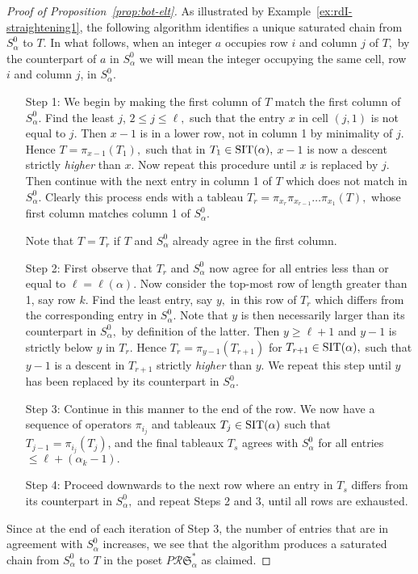 \documentclass[12pt,letterpaper]{amsart}
\theoremstyle{definition}
\newcommand{\rdI}{\mathcal{R}\mathfrak{S}^*}
\begin{document}
\begin{proof}[Proof of Proposition~\ref{prop:bot-elt}]  As illustrated by Example~\ref{ex:rdI-straightening1}, the following algorithm identifies a unique saturated  chain from $S^0_\alpha$ to $T.$  In what follows, when an integer  $a$ occupies row $i$ and column $j$ of $T,$ by the counterpart of $a$ in $S^0_\alpha$ we will mean the integer occupying the same cell, row $i$ and column $j$, in $S^0_\alpha.$ 
\begin{enumerate}
    \item[Step 1:] We begin by making the first column of $T$ match the first column of $S^0_\alpha.$  Find the least $j$, $2\le j\le \ell,$ such that the entry $x$ in cell $(j,1)$ is not equal to $j.$ Then $x-1$ is in a lower row, not in column 1 by minimality of $j$. Hence $T=\pi_{x-1}(T_1),$ such that in $T_1\in\operatorname{SIT}(\alpha),$  $x-1$ is now a descent strictly \textit{higher} than $x.$  Now repeat this procedure until $x$ is replaced by $j.$ Then continue with the next entry in column 1 of $T$ which does not match 
    in $S^0_\alpha.$  Clearly this process ends with a tableau $T_r=\pi_{x_r}\pi_{x_{r-1}}\ldots \pi_{x_1}(T),$ whose first column matches  column 1 of $S^0_\alpha.$
    
    Note that $T=T_r$ if $T$ and $S^0_\alpha$ already agree in the first column.
    \item[Step 2:] First observe that $T_r$ and $S^0_\alpha$ now agree for all entries less than or equal to $\ell=\ell(\alpha).$ Now consider the top-most row of length greater than 1, say row $k$.  Find the least entry, say $y,$ in this row of $T_r$ which differs from the corresponding entry in $S^0_\alpha.$ Note that $y$ is then necessarily larger than its counterpart in $S^0_\alpha,$ by definition of the latter. Then $y\ge \ell+1$ and $y-1$ is strictly below $y$ in $T_r.$  Hence 
    $T_r=\pi_{y-1}(T_{r+1})$ for $T_{r+1}\in \operatorname{SIT}(\alpha),$ such that $y-1$ is a descent in $T_{r+1}$  strictly \textit{higher} than $y$.  We repeat this step until $y$ has been replaced by its counterpart in $S^0_\alpha.$  
    
    \item[Step 3:] Continue in this manner to the end of the row. We now have a sequence of operators $\pi_{i_j}$ and tableaux $T_j\in \operatorname{SIT}(\alpha)$ such that $T_{j-1}=\pi_{i_j}(T_j)$, and the final tableaux $T_s$ agrees with $S^0_\alpha$ for all entries $\le \ell+(\alpha_k-1).$ 
    
    \item[Step 4:] Proceed  downwards to the next row where an entry in $T_s$ differs from its counterpart in $S^0_\alpha,$ and repeat Steps 2 and 3, until all rows are exhausted. 
\end{enumerate}
Since at the end of each iteration of Step 3,  the number of entries that are in agreement  with $S^0_\alpha$ increases, we see that the algorithm produces a saturated chain from $S^0_\alpha$ to $T$ in the poset $P\rdI_\alpha$ as claimed.
\end{proof}
\end{document}
